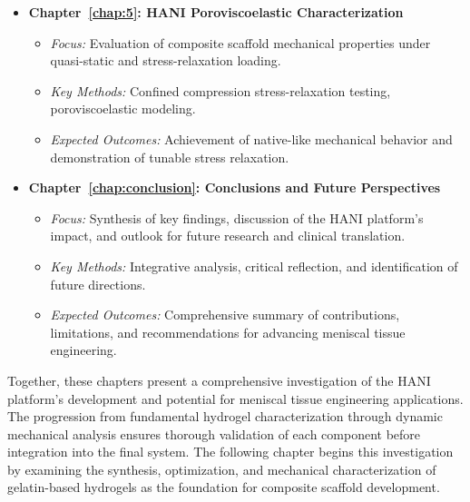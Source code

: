 \begin{itemize}
    \item \textbf{Chapter~\ref{chap:5}: HANI Poroviscoelastic Characterization}
    \begin{itemize}
        \item \textit{Focus:} Evaluation of composite scaffold mechanical properties under quasi-static and stress-relaxation loading.
        \item \textit{Key Methods:} Confined compression stress-relaxation testing, poroviscoelastic modeling.
        \item \textit{Expected Outcomes:} Achievement of native-like mechanical behavior and demonstration of tunable stress relaxation.
    \end{itemize}
    

    \item \textbf{Chapter~\ref{chap:conclusion}: Conclusions and Future Perspectives}
    \begin{itemize}
        \item \textit{Focus:} Synthesis of key findings, discussion of the HANI platform's impact, and outlook for future research and clinical translation.
        \item \textit{Key Methods:} Integrative analysis, critical reflection, and identification of future directions.
        \item \textit{Expected Outcomes:} Comprehensive summary of contributions, limitations, and recommendations for advancing meniscal tissue engineering.
    \end{itemize}
\end{itemize}

Together, these chapters present a comprehensive investigation of the HANI platform's development and potential for meniscal tissue engineering applications. The progression from fundamental hydrogel characterization through dynamic mechanical analysis ensures thorough validation of each component before integration into the final system. The following chapter begins this investigation by examining the synthesis, optimization, and mechanical characterization of gelatin-based hydrogels as the foundation for composite scaffold development.

